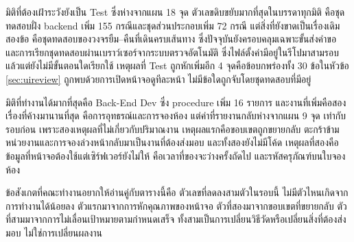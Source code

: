 มิติที่ต้องเฝ้าระวังยังเป็น Test ซึ่งห่างจากแผน 18 จุด ตัวเลขดิบขยับมากที่สุดในบรรดาทุกมิติ คือชุดทดสอบฝั่ง backend เพิ่ม 155 กรณีและชุดส่วนประกอบเพิ่ม 72 กรณี แต่สิ่งที่ยังขาดเป็นเรื่องเดิมสองข้อ คือชุดทดสอบของวงจรยืม–คืนที่เดินครบเส้นทาง ซึ่งปัจจุบันยังครอบคลุมเฉพาะขั้นส่งคำขอ และการเรียกชุดทดสอบผ่านเบราว์เซอร์จากระบบตรวจอัตโนมัติ ซึ่งไฟล์ตั้งค่ามีอยู่ในรีโปมาสามรอบแล้วแต่ยังไม่มีขั้นตอนใดเรียกใช้ เหตุผลที่ Test ถูกหักเพิ่มอีก 4 จุดคือข้อบกพร่องทั้ง 30 ข้อในหัวข้อ \ref{sec:uireview} ถูกพบด้วยการเปิดหน้าจอดูทีละหน้า ไม่มีข้อใดถูกจับโดยชุดทดสอบที่มีอยู่

มิติที่ทำงานได้มากที่สุดคือ Back-End Dev ซึ่ง procedure เพิ่ม 16 รายการ และงานที่เพิ่มคือสองเรื่องที่ค้างมานานที่สุด คือการอุทธรณ์และการจองห้อง แต่ค่าที่รายงานกลับห่างจากแผน 9 จุด เท่ากับรอบก่อน เพราะสองเหตุผลที่ไม่เกี่ยวกับปริมาณงาน เหตุผลแรกคือขอบเขตถูกขยายกลับ ตะกร้าข้ามหน่วยงานและการจองล่วงหน้ากลับมาเป็นงานที่ต้องส่งมอบ และทั้งสองยังไม่มีโค้ด เหตุผลที่สองคือข้อมูลที่หน้าจอต้องใช้แต่เซิร์ฟเวอร์ยังไม่ให้ คือเวลาที่ของจะว่างครั้งถัดไป และรหัสครุภัณฑ์บนใบจองห้อง

ข้อสังเกตที่คณะทำงานอยากให้อ่านคู่กับตารางนี้คือ ตัวเลขที่ลดลงสามตัวในรอบนี้ ไม่มีตัวไหนเกิดจากการทำงานได้น้อยลง ตัวแรกมาจากการหักคุณภาพของหน้าจอ ตัวที่สองมาจากขอบเขตที่ขยายกลับ ตัวที่สามมาจากการไม่เลื่อนเป้าหมายตามกำหนดเสร็จ ทั้งสามเป็นการเปลี่ยนวิธีวัดหรือเปลี่ยนสิ่งที่ต้องส่งมอบ ไม่ใช่การเปลี่ยนผลงาน

